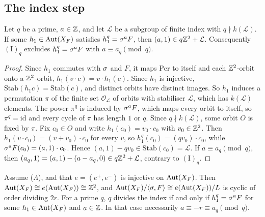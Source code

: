 \subsection{The index step}\label{gen:sec:index}

\begin{lemma}\label{gen:lem:orbit}
Let $q$ be a prime, $a\in\mathbb{Z}$, and let $\mathcal L$ be a subgroup of finite index with $q\nmid k(\mathcal L)$. If some $h_1\in\operatorname{Aut}(X_F)$ satisfies $h_1^q=\sigma^aF$, then $(a,1)\in q\mathbb{Z}^2+\mathcal L$. Consequently $(\mathrm{I})_q$ excludes $h_1^q=\sigma^aF$ with $a\equiv a_q\pmod q$.
\end{lemma}

\begin{proof}
Since $h_1$ commutes with $\sigma$ and $F$, it maps $\mathrm{Per}$ to itself and each $\mathbb{Z}^2$-orbit onto a $\mathbb{Z}^2$-orbit, $h_1(v\cdot c)=v\cdot h_1(c)$. Since $h_1$ is injective, $\mathrm{Stab}(h_1c)=\mathrm{Stab}(c)$, and distinct orbits have distinct images. So $h_1$ induces a permutation $\pi$ of the finite set $\mathcal O_{\mathcal L}$ of orbits with stabiliser $\mathcal L$, which has $k(\mathcal L)$ elements. The power $\pi^q$ is induced by $\sigma^aF$, which maps every orbit to itself, so $\pi^q=\mathrm{id}$ and every cycle of $\pi$ has length $1$ or $q$. Since $q\nmid k(\mathcal L)$, some orbit $O$ is fixed by $\pi$. Fix $c_0\in O$ and write $h_1(c_0)=v_0\cdot c_0$ with $v_0\in\mathbb{Z}^2$. Then $h_1(v\cdot c_0)=(v+v_0)\cdot c_0$ for every $v$, so $h_1^q(c_0)=(qv_0)\cdot c_0$, while $\sigma^aF(c_0)=(a,1)\cdot c_0$. Hence $(a,1)-qv_0\in\mathrm{Stab}(c_0)=\mathcal L$. If $a\equiv a_q\pmod q$, then $(a_q,1)=(a,1)-(a-a_q,0)\in q\mathbb{Z}^2+\mathcal L$, contrary to $(\mathrm{I})_q$.
\end{proof}

\begin{lemma}\label{gen:lem:root}
Assume \textup{($\Lambda$)}, and that $e=(e^+,e^-)$ is injective on $\operatorname{Aut}(X_F)$. Then $\operatorname{Aut}(X_F)\cong e(\operatorname{Aut}(X_F))\cong\mathbb{Z}^2$, and $\operatorname{Aut}(X_F)/\langle\sigma,F\rangle\cong e(\operatorname{Aut}(X_F))/L$ is cyclic of order dividing $2r$. For a prime $q$, $q$ divides the index if and only if $h_1^q=\sigma^aF$ for some $h_1\in\operatorname{Aut}(X_F)$ and $a\in\mathbb{Z}$. In that case necessarily $a\equiv-r\equiv a_q\pmod q$.
\end{lemma}

